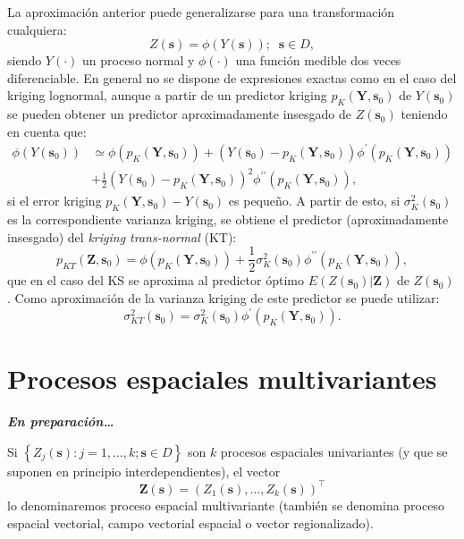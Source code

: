 \documentclass[
  spanish,
]{book}
\theoremstyle{break}
\theoremstyle{definition}
\theoremstyle{definition}
\theoremstyle{definition}
\theoremstyle{definition}
\theoremstyle{remark}
\begin{document}
La aproximación anterior puede generalizarse para una transformación
cualquiera:
\[Z(\mathbf{s})=\phi \left( Y(\mathbf{s})\right) ;\;\;\mathbf{s}\in D,\]
siendo \(Y(\cdot)\) un proceso normal y \(\phi (\cdot)\) una función medible dos veces diferenciable.
En general no se dispone de expresiones exactas como en el caso del kriging lognormal, aunque a partir de un predictor kriging \(p_{K} (\mathbf{Y},\mathbf{s}_{0})\) de \(Y(\mathbf{s}_{0})\) se pueden obtener un predictor aproximadamente insesgado de \(Z(\mathbf{s}_{0})\) teniendo en cuenta que:
\[\begin{aligned}
\phi (Y(\mathbf{s}_{0})) & \simeq \phi (p_{K}(\mathbf{Y},\mathbf{s}_{0}))+(Y(\mathbf{s}_{0})-p_{K}(\mathbf{Y},\mathbf{s}_{0}))\phi^\prime (p_{K}(\mathbf{Y},\mathbf{s}_{0})) \\
 & +\frac{1}{2} (Y(\mathbf{s}_{0})-p_{K}(\mathbf{Y},\mathbf{s}_{0}))^{2} \phi^{\prime\prime} (p_{K}(\mathbf{Y},\mathbf{s}_{0})),
\end{aligned}\]
si el error kriging \(p_{K} (\mathbf{Y},\mathbf{s}_{0})-Y(\mathbf{s}_{0})\) es pequeño.
A partir de esto, si \(\sigma_{K}^{2} (\mathbf{s}_{0})\) es la correspondiente varianza kriging, se obtiene el predictor (aproximadamente insesgado) del \emph{kriging trans-normal} (KT):
\[p_{KT} (\mathbf{Z},\mathbf{s}_{0}) = \phi \left( p_{K}(\mathbf{Y},\mathbf{s}_{0})\right) + \frac{1}{2} \sigma_{K}^{2}(\mathbf{s}_{0}) \phi^{\prime\prime} \left( p_{K}(\mathbf{Y},\mathbf{s}_{0}) \right),\]
que en el caso del KS se aproxima al predictor óptimo \(E\left( \left. Z(\mathbf{s}_{0})\right| \mathbf{Z}\right)\) de \(Z(\mathbf{s}_{0})\).
Como aproximación de la varianza kriging de este predictor se puede utilizar:
\[\sigma_{KT}^{2}(\mathbf{s}_{0}) = \sigma_{K}^{2}(\mathbf{s}_{0}) \phi^{\prime} (p_{K}(\mathbf{Y},\mathbf{s}_{0})).\]

\hypertarget{multivar}{%
\chapter{Procesos espaciales multivariantes}\label{multivar}}

\textbf{\emph{En preparación\ldots{}}}

Si \(\left\{ Z_{j}(\mathbf{s}):j=1, \ldots, k;\mathbf{s}\in D\right\}\)
son \(k\) procesos espaciales univariantes (y que se suponen en principio interdependientes), el vector
\[\mathbf{Z}(\mathbf{s})=(Z_{1}(\mathbf{s}), \ldots, Z_{k}(\mathbf{s}))^\top\]
lo denominaremos proceso espacial multivariante (también se denomina proceso espacial vectorial, campo vectorial espacial o vector regionalizado).
\end{document}
